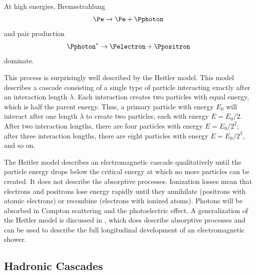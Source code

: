 At high energies, Bremsstrahlung
\begin{equation}
\Pe \to \Pe + \Pphoton
\end{equation}
and pair production
\begin{equation}
\Pphoton^* \to \Pelectron + \Ppositron
\end{equation}
dominate.

This process is surprisingly well described by the Heitler model.  This
model describes a cascade consisting of a single type of particle interacting
exactly after an interaction length $\lambda$.  Each interaction creates two
particles with equal energy, which is half the parent energy.  Thus, a
primary particle with energy $E_0$ will interact after one length $\lambda$ to
create two particles, each with energy $E = E_0 / 2$.  After two interaction
lengths, there are four particles with energy $E = E_0 / 2^2$; after three
interaction lengths, there are eight particles with energy $E = E_0 / 2^3$, and so
on.

The Heitler model \cite{Heitler:1954} describes an electromagnetic cascade
qualitatively until the particle energy drops below the critical energy at which
no more particles can be created.  It does not describe the absorptive
processes.  Ionization losses mean that electrons and positrons lose energy
rapidly until they annihilate (positrons with atomic electrons) or recombine
(electrons with ionized atoms).
Photons will be absorbed in Compton scattering and the photoelectric effect. A
generalization of the Heitler model is discussed in \cite{Montanus:2011}, which
does describe absorptive processes and can be used to describe the full
longitudinal development of an electromagnetic shower.


\subsection{Hadronic Cascades}

